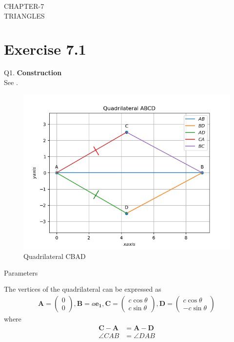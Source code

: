 \documentclass{article}
\newcommand{\myvec}[1]{\ensuremath{\begin{pmatrix}#1\end{pmatrix}}}
\let\vec\mathbf
\begin{document}
\begin{center}
        \textbf\large{CHAPTER-7 \\ TRIANGLES}
\end{center}
\section{Exercise 7.1}
Q1. \textbf{Construction}\\
\fi
See 
	  .
\begin{figure}[h]
	\begin{center}
		\includegraphics[width=\columnwidth]{chapters/9/7/1/1/figs/fig.png}
	\end{center}
	\caption{Quadrilateral CBAD}
	\label{fig:chapters/9/7/1/1/Fig1}
\end{figure}
\begin{table}[h]
	  \centering
	  
	  \caption{Parameters}
	  \label{tab:9/7/1/1/Table1}
\end{table}
The vertices of the quadrilateral can be expressed as
\begin{align}
	\vec{A} = \myvec{0\\0},\vec{B} = a\vec{e_1},\vec{C} = \myvec{c\cos\theta\\c\sin\theta},\vec{D} = \myvec{c\cos\theta\\-c\sin\theta}
\end{align}
where
\begin{align}
	\vec{C}-\vec{A} &= \vec{A}-\vec{D}\\
	\angle{CAB} &= \angle{DAB}
\end{align}
\end{document}
